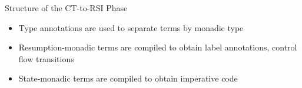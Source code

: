 \documentclass{beamer}
\begin{document}
\begin{frame}{Structure of the CT-to-RSI Phase}

\begin{center}
\end{center}

\begin{itemize}

\item{Type annotations are used to separate terms by monadic type}

\item{Resumption-monadic terms are compiled to obtain label annotations, control flow transitions}

\item{State-monadic terms are compiled to obtain imperative code}

\end{itemize}

\end{frame}
\end{document}
